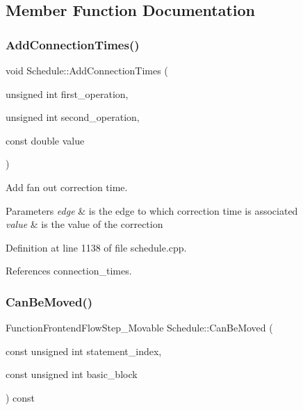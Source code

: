 \subsection{Member Function Documentation}
\mbox{\label{classSchedule_aae7b5c12a1beb8b9d2c8986b06a705c2}} 
\subsubsection{\texorpdfstring{Add\+Connection\+Times()}{AddConnectionTimes()}}
{\footnotesize\ttfamily void Schedule\+::\+Add\+Connection\+Times (\begin{DoxyParamCaption}\item[{unsigned int}]{first\+\_\+operation,  }\item[{unsigned int}]{second\+\_\+operation,  }\item[{const double}]{value }\end{DoxyParamCaption})}



Add fan out correction time. 


\begin{DoxyParams}{Parameters}
{\em edge} & is the edge to which correction time is associated \\
\hline
{\em value} & is the value of the correction \\
\hline
\end{DoxyParams}


Definition at line 1138 of file schedule.\+cpp.



References connection\+\_\+times.

\mbox{\label{classSchedule_aa45880695985aff9d1433a96c23cc960}} 
\subsubsection{\texorpdfstring{Can\+Be\+Moved()}{CanBeMoved()}}
{\footnotesize\ttfamily Function\+Frontend\+Flow\+Step\+\_\+\+Movable Schedule\+::\+Can\+Be\+Moved (\begin{DoxyParamCaption}\item[{const unsigned int}]{statement\+\_\+index,  }\item[{const unsigned int}]{basic\+\_\+block }\end{DoxyParamCaption}) const}



